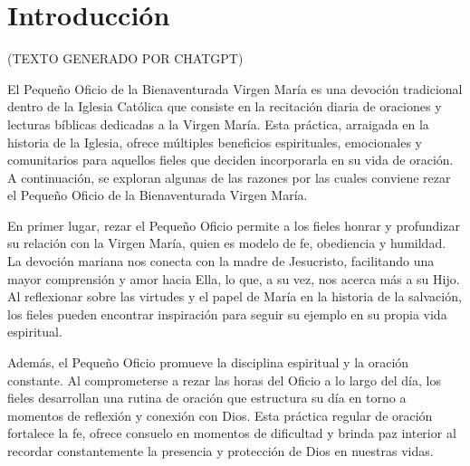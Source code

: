\documentclass[12pt,a5paper,openright]{memoir}
\begin{document}
\cleardoublepage



\renewcommand{\thepage}{\roman{page}}

\setcounter{page}{1}

\tableofcontents*




\cleardoublepage

\renewcommand{\thepage}{\arabic{page}}

\setcounter{page}{1}



\cleardoublepage
\chapter*{Introducción}


(TEXTO GENERADO POR CHATGPT)

El Pequeño Oficio de la Bienaventurada Virgen María es una devoción tradicional dentro de la Iglesia Católica que consiste en la recitación diaria de oraciones y lecturas bíblicas dedicadas a la Virgen María. Esta práctica, arraigada en la historia de la Iglesia, ofrece múltiples beneficios espirituales, emocionales y comunitarios para aquellos fieles que deciden incorporarla en su vida de oración. A continuación, se exploran algunas de las razones por las cuales conviene rezar el Pequeño Oficio de la Bienaventurada Virgen María.

En primer lugar, rezar el Pequeño Oficio permite a los fieles honrar y profundizar su relación con la Virgen María, quien es modelo de fe, obediencia y humildad. La devoción mariana nos conecta con la madre de Jesucristo, facilitando una mayor comprensión y amor hacia Ella, lo que, a su vez, nos acerca más a su Hijo. Al reflexionar sobre las virtudes y el papel de María en la historia de la salvación, los fieles pueden encontrar inspiración para seguir su ejemplo en su propia vida espiritual.

Además, el Pequeño Oficio promueve la disciplina espiritual y la oración constante. Al comprometerse a rezar las horas del Oficio a lo largo del día, los fieles desarrollan una rutina de oración que estructura su día en torno a momentos de reflexión y conexión con Dios. Esta práctica regular de oración fortalece la fe, ofrece consuelo en momentos de dificultad y brinda paz interior al recordar constantemente la presencia y protección de Dios en nuestras vidas.
\end{document}
